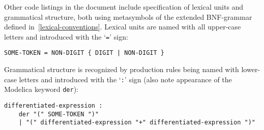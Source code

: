 Other code listings in the document include specification of lexical units and grammatical structure, both using metasymbols of the extended BNF-grammar defined in~\cref{lexical-conventions}.
Lexical units are named with all upper-case letters and introduced with the `\lstinline[language=grammar]!=!' sign:
\begin{lstlisting}[language=grammar]
SOME-TOKEN = NON-DIGIT { DIGIT | NON-DIGIT }
\end{lstlisting}
Grammatical structure is recognized by production rules being named with lower-case letters and introduced with the `\lstinline[language=grammar]!:!' sign (also note appearance of the Modelica keyword \lstinline!der!):
\begin{lstlisting}[language=grammar]
differentiated-expression :
    der "(" SOME-TOKEN ")"
    | "(" differentiated-expression "+" differentiated-expression ")"
\end{lstlisting}
